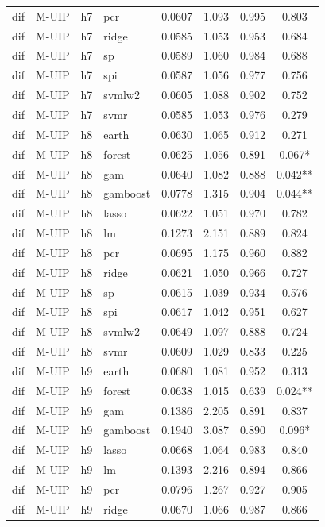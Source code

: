 \begin{ThreePartTable}
\begin{longtable}[t]{llclcccc}
dif & M-UIP & h7 & pcr & 0.0607 & 1.093 & 0.995 & 0.803\\
dif & M-UIP & h7 & ridge & 0.0585 & 1.053 & 0.953 & 0.684\\
dif & M-UIP & h7 & sp & 0.0589 & 1.060 & 0.984 & 0.688\\
dif & M-UIP & h7 & spi & 0.0587 & 1.056 & 0.977 & 0.756\\
dif & M-UIP & h7 & svmlw2 & 0.0605 & 1.088 & 0.902 & 0.752\\
dif & M-UIP & h7 & svmr & 0.0585 & 1.053 & 0.976 & 0.279\\
\addlinespace
dif & M-UIP & h8 & earth & 0.0630 & 1.065 & 0.912 & 0.271\\
dif & M-UIP & h8 & forest & 0.0625 & 1.056 & 0.891 & 0.067*\\
dif & M-UIP & h8 & gam & 0.0640 & 1.082 & 0.888 & 0.042**\\
dif & M-UIP & h8 & gamboost & 0.0778 & 1.315 & 0.904 & 0.044**\\
dif & M-UIP & h8 & lasso & 0.0622 & 1.051 & 0.970 & 0.782\\
dif & M-UIP & h8 & lm & 0.1273 & 2.151 & 0.889 & 0.824\\
dif & M-UIP & h8 & pcr & 0.0695 & 1.175 & 0.960 & 0.882\\
dif & M-UIP & h8 & ridge & 0.0621 & 1.050 & 0.966 & 0.727\\
dif & M-UIP & h8 & sp & 0.0615 & 1.039 & 0.934 & 0.576\\
dif & M-UIP & h8 & spi & 0.0617 & 1.042 & 0.951 & 0.627\\
dif & M-UIP & h8 & svmlw2 & 0.0649 & 1.097 & 0.888 & 0.724\\
dif & M-UIP & h8 & svmr & 0.0609 & 1.029 & 0.833 & 0.225\\
\addlinespace
dif & M-UIP & h9 & earth & 0.0680 & 1.081 & 0.952 & 0.313\\
dif & M-UIP & h9 & forest & 0.0638 & 1.015 & 0.639 & 0.024**\\
dif & M-UIP & h9 & gam & 0.1386 & 2.205 & 0.891 & 0.837\\
dif & M-UIP & h9 & gamboost & 0.1940 & 3.087 & 0.890 & 0.096*\\
dif & M-UIP & h9 & lasso & 0.0668 & 1.064 & 0.983 & 0.840\\
dif & M-UIP & h9 & lm & 0.1393 & 2.216 & 0.894 & 0.866\\
dif & M-UIP & h9 & pcr & 0.0796 & 1.267 & 0.927 & 0.905\\
dif & M-UIP & h9 & ridge & 0.0670 & 1.066 & 0.987 & 0.866\\

\end{longtable}
\end{ThreePartTable}
